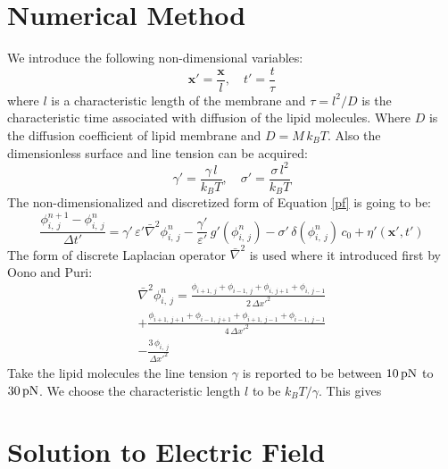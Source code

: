 \documentclass[english,12pt]{article}
\begin{document}
\section{Numerical Method}
We introduce the following non-dimensional variables:
\begin{equation*}
\mathbf{x}'=\frac{\mathbf{x}}{l}, \quad t'=\frac{t}{\tau}
\end{equation*}
where $l$ is a characteristic length of the membrane and $\tau=l^2/D$ is the characteristic time associated with diffusion of the lipid molecules. Where $D$ is the diffusion coefficient of lipid membrane and $D=M\,k_B T$. Also the dimensionless surface and line tension can be acquired:
\begin{equation*}
\gamma'=\frac{\gamma\,l}{k_B T}, \quad \sigma'=\frac{\sigma\,l^2}{k_B T}
\end{equation*}
 The non-dimensionalized and discretized form of Equation \ref{pf} is going to be:
\begin{equation}
	\frac{\phi^{n+1}_{i,\ j}-\phi^{n}_{i,\ j}}{\Delta{t'}}={\gamma'}\,{\varepsilon'}\bar{\nabla}^2\phi^{n}_{i,\ j}-\frac{{\gamma}'}{\varepsilon'}
\,g'(\phi^{n}_{i,\ j})-{\sigma}'\,\delta(\phi^{n}_{i,\ j})\,c_0+{\eta}'(\mathbf{{x'}},{t'})
\end{equation}
The form of discrete Laplacian operator $\bar{\nabla}^2$ is used where it introduced first by Oono and Puri:
\begin{equation}
\begin{split}
\bar{\nabla}^2{\phi^{n}_{i,\ j}}=\frac{\phi_{i+1,\ j}+\phi_{i-1,\ j}+\phi_{i,\ j+1}+\phi_{i,\ j-1}}{2\,{\Delta x'}^{2}}\\
+\frac{\phi_{i+1,\ j+1}+\phi_{i-1,\ j+1}+\phi_{i+1,\ j-1}+\phi_{i-1,\ j-1}}{4\,{\Delta x'}^{2}}\\
-\frac{3\,\phi_{i,\ j}}{{\Delta x'}^2}
\end{split}
\end{equation}
Take the lipid molecules the line tension $\gamma$ is reported to be between $\unit[10]{pN}$ to $\unit[30]{pN}$. We choose the characteristic length $l$ to be $k_B T/\gamma$. This gives 
\newpage
\appendix
\section{Solution to Electric Field}

\newpage


\end{document}
